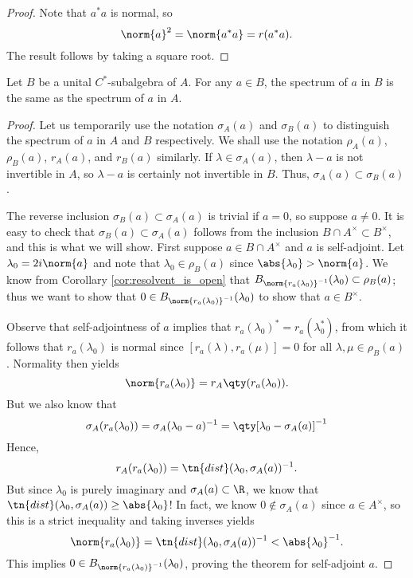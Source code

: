 \begin{proof}
Note that $a^*a$ is normal, so 
\begin{equation}
\norm{a}^2 = \norm{a^*a} = r(a^*a).
\end{equation}
The result follows by taking a square root.
\end{proof}


\begin{theorem} 
Let $B$ be a unital $C^*$-subalgebra of $A$. For any $a \in B$, the spectrum of $a$ in $B$ is the same as the spectrum of $a$ in $A$.
\end{theorem}

\begin{proof}
Let us temporarily use the notation $\sigma_A(a)$ and $\sigma_B(a)$ to distinguish the spectrum of $a$ in $A$ and $B$ respectively. We shall use the notation $\rho_A(a)$, $\rho_B(a)$, $r_A(a)$, and $r_B(a)$ similarly. If $\lambda \in \sigma_A(a)$, then $\lambda - a$ is not invertible in $A$, so $\lambda - a$ is certainly not invertible in $B$. Thus, $\sigma_A(a) \subset \sigma_B(a)$. 

The reverse inclusion $\sigma_B(a) \subset \sigma_A(a)$ is trivial if $a = 0$, so suppose $a \neq 0$. It is easy to check that $\sigma_B(a) \subset \sigma_A(a)$ follows from the inclusion $B \cap A^\times \subset B^\times$, and this is what we will show. First suppose $a \in B \cap A^\times$ and $a$ is self-adjoint. Let $\lambda_0 = 2i \norm{a}$ and note that $\lambda_0 \in \rho_B(a)$ since $\abs{\lambda_0} > \norm{a}$. We know from Corollary \ref{cor:resolvent_is_open} that $B_{\norm{r_a(\lambda_0)}^{-1}}(\lambda_0) \subset \rho_B(a)$; thus we want to show that $0 \in B_{\norm{r_a(\lambda_0)}^{-1}}(\lambda_0)$ to show that $a \in B^\times$.

Observe that self-adjointness of $a$ implies that $r_a(\lambda_0)^* = r_a(\lambda_0^*)$, from which it follows that $r_a(\lambda_0)$ is normal since $[r_a(\lambda), r_a(\mu)] = 0$ for all $\lambda, \mu \in \rho_B(a)$. Normality then yields
\begin{equation}
\norm{r_a(\lambda_0)} = r_A\qty(r_a(\lambda_0)).
\end{equation}
But we also know that
\begin{equation}
\sigma_A(r_a(\lambda_0)) = \sigma_A(\lambda_0 - a)^{-1} = \qty[\lambda_0 - \sigma_A(a)]^{-1}
\end{equation}
Hence, 
\begin{equation}
r_A(r_a(\lambda_0)) = \tn{dist}(\lambda_0, \sigma_A(a))^{-1}.
\end{equation}
But since $\lambda_0$ is purely imaginary and $\sigma_A(a) \subset \R$, we know that $\tn{dist}(\lambda_0, \sigma_A(a)) \geq \abs{\lambda_0}$! In fact,  we know $0 \notin \sigma_A(a)$ since $a \in A^\times$, so this is a strict inequality and taking inverses yields
\begin{equation}
\norm{r_a(\lambda_0)} = \tn{dist}(\lambda_0, \sigma_A(a))^{-1} < \abs{\lambda_0}^{-1}.
\end{equation}
This implies $0 \in B_{\norm{r_a(\lambda_0)}^{-1}}(\lambda_0)$, proving the theorem for self-adjoint $a$.


\end{proof}
